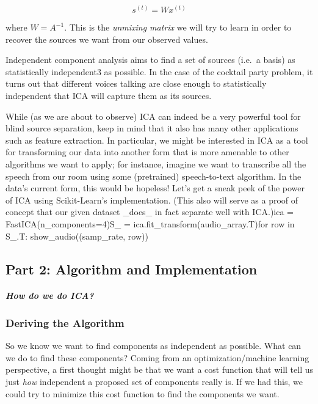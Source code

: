 \documentclass[11pt]{article}
\begin{document}
\[
s^{(t)} = Wx^{(t)}
\]

where \(W = A^{-1}\). This is the \emph{unmixing matrix} we will try to
learn in order to recover the sources we want from our observed values.

    Independent component analysis aims to find a set of sources (i.e.~a
basis) as statistically independent3 as possible. In the case of the
cocktail party problem, it turns out that different voices talking are
close enough to statistically independent that ICA will capture them as
its sources.

    While (as we are about to observe) ICA can indeed be a very powerful
tool for blind source separation, keep in mind that it also has many
other applications such as feature extraction. In particular, we might
be interested in ICA as a tool for transforming our data into another
form that is more amenable to other algorithms we want to apply; for
instance, imagine we want to transcribe all the speech from our room
using some (pretrained) speech-to-text algorithm. In the data's current
form, this would be hopeless!
Let's get a sneak peek of the power of ICA using Scikit-Learn's implementation. (This also will serve as a proof of concept that our given dataset _does_ in fact separate well with ICA.)ica = FastICA(n_components=4)S_ = ica.fit_transform(audio_array.T)for row in S_.T:
    show_audio((samp_rate, row))
    \hypertarget{part-2-algorithm-and-implementation}{%
\subsection{Part 2: Algorithm and
Implementation}\label{part-2-algorithm-and-implementation}}

\hypertarget{how-do-we-do-ica}{%
\paragraph{\texorpdfstring{\emph{How do we do
ICA?}}{How do we do ICA?}}\label{how-do-we-do-ica}}

    \hypertarget{deriving-the-algorithm}{%
\subsubsection{Deriving the Algorithm}\label{deriving-the-algorithm}}

    So we know we want to find components as independent as possible. What
can we do to find these components? Coming from an optimization/machine
learning perspective, a first thought might be that we want a cost
function that will tell us just \emph{how} independent a proposed set of
components really is. If we had this, we could try to minimize this cost
function to find the components we want.
\end{document}
